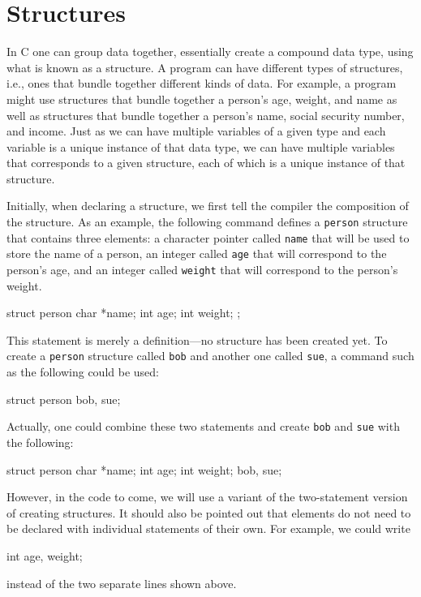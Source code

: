 
\section{Structures}


In C one can group data together, essentially create a compound data
type, using what is known as a structure.  A program can have
different types of structures, i.e., ones that bundle together
different kinds of data.  For example, a program might use structures
that bundle together a person's age, weight, and name as well as
structures that bundle together a person's name, social security
number, and income.  Just as we can have multiple variables of a given
type and each variable is a unique instance of that data type, we can
have multiple variables that corresponds to a given structure, each of
which is a unique instance of that structure.  

Initially, when declaring a structure, we first tell the compiler the
composition of the structure.  As an example, the following command
defines a {\tt person} structure that contains three elements: a
character pointer called {\tt name} that will be used to store the
name of a person, an integer called {\tt age} that will correspond to
the person's age, and an integer called {\tt weight} that will
correspond to the person's weight.
\begin{code}
  struct person {
    char *name;
    int age;
    int weight;
  };
\end{code}
This statement is merely a definition---no structure has been created
yet.  To create a {\tt person} structure called {\tt bob} and another
one called {\tt sue}, a command such as the following could be
used:
\begin{code}
  struct person bob, sue;
\end{code}
Actually, one could combine these two statements and create {\tt bob}
and {\tt sue} with the following:
\begin{code}
  struct person {
    char *name;
    int age;
    int weight;
  }  bob, sue;
\end{code}
However, in the code to come, we will use a variant of the
two-statement version of creating structures.  It should also be
pointed out that elements do not need to be declared with individual
statements of their own.  For example, we could write
\begin{code}
  int age, weight;
\end{code}
instead of the two separate lines shown above. 

